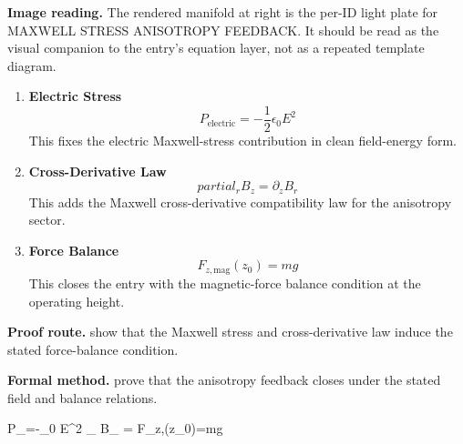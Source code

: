 \begin{samepage}
\noindent\begin{minipage}[t]{0.45\linewidth}
\vspace{0pt}
\raggedright
\scriptsize\textbf{Image reading.} The rendered manifold at right is the per-ID light plate for MAXWELL STRESS ANISOTROPY FEEDBACK. It should be read as the visual companion to the entry's equation layer, not as a repeated template diagram.\par
\end{minipage}\hfill
\begin{minipage}[t]{0.53\linewidth}
\vspace*{-0.10in}
\raggedright
{}
\end{minipage}
\end{samepage}

\clearpage


\begin{enumerate}[leftmargin=1.6em,itemsep=9pt,topsep=6pt]
\item \textbf{Electric Stress}
\[
P_{\mathrm{electric}}=-\frac{1}{2}\epsilon_0 E^{2}
\]
This fixes the electric Maxwell-stress contribution in clean field-energy form.

\item \textbf{Cross-Derivative Law}
\[
partial_r B_z=\partial_z B_r
\]
This adds the Maxwell cross-derivative compatibility law for the anisotropy sector.

\item \textbf{Force Balance}
\[
F_{z,\mathrm{mag}}(z_0)=mg
\]
This closes the entry with the magnetic-force balance condition at the operating height.
\end{enumerate}

\textbf{Proof route.} show that the Maxwell stress and cross-derivative law induce the stated force-balance condition.

\textbf{Formal method.} prove that the anisotropy feedback closes under the stated field and balance relations.

\medskip
{}

\begin{tzpsnapshot}
\end{tzpsnapshot}

\tzpequationlinks
  {P_{}=-\epsilon_0 E^{2}}
  {\partial_{} B_{} = \cdots}
  {F_{z,}(z_0)=mg}
